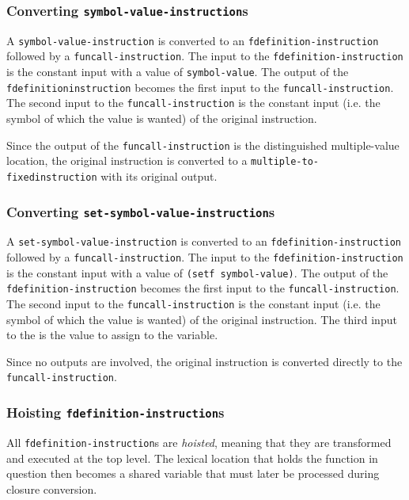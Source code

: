 \subsubsection{Converting \texttt{symbol-value-instruction}s}

A \texttt{symbol-value-instruction} is converted to an
\texttt{fdefinition-instruction} followed by a
\texttt{funcall-instruction}.  The input to the
\texttt{fdefinition-instruction} is the constant input with a value of
\texttt{symbol-value}.  The output of the
\texttt{fdefinition\-instruction} becomes the first input to the
\texttt{funcall-instruction}.  The second input to the
\texttt{funcall-instruction} is the constant input (i.e. the symbol
of which the value is wanted) of the original instruction.

Since the output of the \texttt{funcall-instruction} is the
distinguished multiple-value location, the original instruction is
converted to a \texttt{multiple-to-fixed\-instruction} with its
original output.

\subsubsection{Converting \texttt{set-symbol-value-instruction}s}

A \texttt{set-symbol-value-instruction} is converted to an
\texttt{fdefinition-instruction} followed by a
\texttt{funcall-instruction}.  The input to the
\texttt{fdefinition-instruction} is the constant input with a value of
\texttt{(setf symbol-value)}.  The output of the
\texttt{fdefinition-instruction} becomes the first input to the
\texttt{funcall-instruction}.  The second input to the
\texttt{funcall-instruction} is the constant input (i.e. the symbol
of which the value is wanted) of the original instruction.  The third
input to the is the value to assign to the variable.

Since no outputs are involved, the original instruction is converted
directly to the \texttt{funcall-instruction}.

\subsubsection{Hoisting \texttt{fdefinition-instruction}s}

All \texttt{fdefinition-instruction}s are \emph{hoisted}, meaning that
they are transformed and executed at the top level.  The lexical
location that holds the function in question then becomes a shared
variable that must later be processed during closure conversion.

